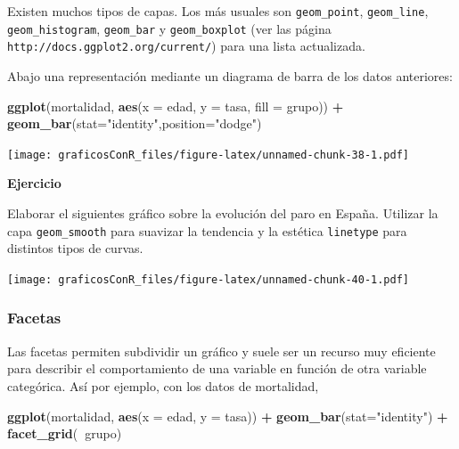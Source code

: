 \documentclass[]{article}
\newenvironment{Shaded}{\begin{snugshade}}{\end{snugshade}}
\newcommand{\DataTypeTok}[1]{\textcolor[rgb]{0.13,0.29,0.53}{#1}}
\newcommand{\KeywordTok}[1]{\textcolor[rgb]{0.13,0.29,0.53}{\textbf{#1}}}
\newcommand{\NormalTok}[1]{#1}
\newcommand{\OperatorTok}[1]{\textcolor[rgb]{0.81,0.36,0.00}{\textbf{#1}}}
\newcommand{\StringTok}[1]{\textcolor[rgb]{0.31,0.60,0.02}{#1}}
\newcounter{ejcnt}[section]
\numberwithin{ejcnt}{section}
\newenvironment{ej}[1][]{%
	\refstepcounter{ejcnt}%
	\par\medskip%
	\noindent%
	\textbf{Ejercicio \theejcnt \;\;}%
	\rmfamily%
}{\medskip}
\begin{document}
Existen muchos tipos de capas. Los más usuales son \texttt{geom\_point}, \texttt{geom\_line}, \texttt{geom\_histogram}, \texttt{geom\_bar} y \texttt{geom\_boxplot} (ver las página \texttt{http://docs.ggplot2.org/current/}) para una lista actualizada.

Abajo una representación mediante un diagrama de barra de los datos anteriores:

\begin{Shaded}
\begin{Highlighting}[]
\KeywordTok{ggplot}\NormalTok{(mortalidad, }\KeywordTok{aes}\NormalTok{(}\DataTypeTok{x =}\NormalTok{ edad, }\DataTypeTok{y =}\NormalTok{ tasa, }\DataTypeTok{fill =}\NormalTok{ grupo)) }\OperatorTok{+}\StringTok{ }
\StringTok{  }\KeywordTok{geom_bar}\NormalTok{(}\DataTypeTok{stat=}\StringTok{"identity"}\NormalTok{,}\DataTypeTok{position=}\StringTok{"dodge"}\NormalTok{)}
\end{Highlighting}
\end{Shaded}

\texttt{[image: graficosConR\_files/figure-latex/unnamed-chunk-38-1.pdf]}

\begin{ej}
Elaborar el siguientes gráfico sobre la evolución del paro en España.
Utilizar la capa \texttt{geom\_smooth} para suavizar la tendencia y la
estética \texttt{linetype} para distintos tipos de curvas.
\end{ej}

\texttt{[image: graficosConR\_files/figure-latex/unnamed-chunk-40-1.pdf]}

\hypertarget{facetas}{%
\subsubsection{Facetas}\label{facetas}}

Las facetas permiten subdividir un gráfico y suele ser un recurso muy eficiente para describir el comportamiento de una variable en función de otra variable categórica. Así por ejemplo, con los datos de mortalidad,

\begin{Shaded}
\begin{Highlighting}[]
\KeywordTok{ggplot}\NormalTok{(mortalidad, }\KeywordTok{aes}\NormalTok{(}\DataTypeTok{x =}\NormalTok{ edad, }\DataTypeTok{y =}\NormalTok{ tasa)) }\OperatorTok{+}\StringTok{ }
\StringTok{  }\KeywordTok{geom_bar}\NormalTok{(}\DataTypeTok{stat=}\StringTok{"identity"}\NormalTok{) }\OperatorTok{+}
\StringTok{  }\KeywordTok{facet_grid}\NormalTok{(}\OperatorTok{~}\NormalTok{grupo)}
\end{Highlighting}
\end{Shaded}
\end{document}
